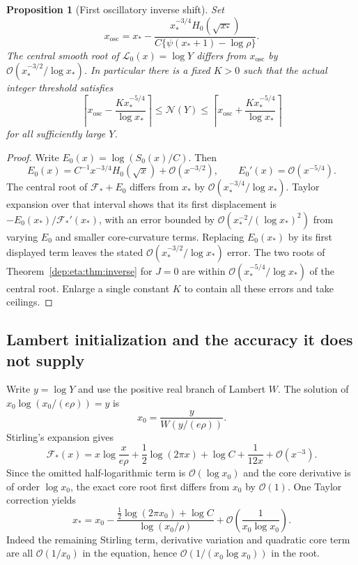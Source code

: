 \documentclass[11pt]{article}
\newtheorem{proposition}[theorem]{Proposition}
\theoremstyle{definition}\newtheorem{definition}[theorem]{Definition}
\theoremstyle{remark}\newtheorem{remark}[theorem]{Remark}
\newcommand{\OO}{\mathcal O}
\begin{document}
\begin{proposition}[First oscillatory inverse shift]\label{dep:eta:prop:shift}
Set
\begin{equation}\label{dep:eta:eq:shift}
 x_{\mathrm{osc}}=x_*-
 \frac{x_*^{-3/4}H_0(\sqrt{x_*})}
      {C\{\psi(x_*+1)-\log\rho\}}.
\end{equation}
The central smooth root of $\mathcal L_0(x)=\log Y$ differs from
$x_{\mathrm{osc}}$ by
$\OO(x_*^{-3/2}/\log x_*)$. In particular there is a fixed $K>0$
such that the actual integer threshold satisfies
\begin{equation}\label{dep:eta:eq:firstceil}
 \left\lceil x_{\mathrm{osc}}-
            \frac{Kx_*^{-5/4}}{\log x_*}\right\rceil
 \le\mathcal N(Y)\le
 \left\lceil x_{\mathrm{osc}}+
            \frac{Kx_*^{-5/4}}{\log x_*}\right\rceil
\end{equation}
for all sufficiently large $Y$.
\end{proposition}
\begin{proof}
Write $E_0(x)=\log(S_0(x)/C)$. Then
\[
 E_0(x)=C^{-1}x^{-3/4}H_0(\sqrt x)+\OO(x^{-3/2}),
 \qquad E_0'(x)=\OO(x^{-5/4}).
\]
The central root of $\mathcal F_*+E_0$ differs from $x_*$ by
$\OO(x_*^{-3/4}/\log x_*)$. Taylor expansion over that interval
shows that its first displacement is
$-E_0(x_*)/\mathcal F_*'(x_*)$, with an error bounded by
$\OO(x_*^{-2}/(\log x_*)^2)$ from varying $E_0$ and smaller
core-curvature terms. Replacing $E_0(x_*)$ by its first displayed
term leaves the stated $\OO(x_*^{-3/2}/\log x_*)$ error.
The two roots of Theorem~\ref{dep:eta:thm:inverse} for $J=0$ are within
$\OO(x_*^{-5/4}/\log x_*)$ of the central root. Enlarge a single
constant $K$ to contain all these errors and take ceilings.
\end{proof}

\subsection{Lambert initialization and the accuracy it does not supply}
Write $y=\log Y$ and use the positive real branch of Lambert $W$.
The solution of $x_0\log(x_0/(e\rho))=y$ is
\begin{equation}\label{dep:eta:eq:lambert}
 x_0=\frac{y}{W(y/(e\rho))}.
\end{equation}
Stirling's expansion gives
\[
 \mathcal F_*(x)=x\log\frac{x}{e\rho}
        +\frac12\log(2\pi x)+\log C+\frac1{12x}+\OO(x^{-3}).
\]
Since the omitted half-logarithmic term is $\OO(\log x_0)$ and the
core derivative is of order $\log x_0$, the exact core root first
differs from $x_0$ by $\OO(1)$. One Taylor correction yields
\begin{equation}\label{dep:eta:eq:lambertcorrect}
 x_*=x_0-
       \frac{\frac12\log(2\pi x_0)+\log C}{\log(x_0/\rho)}
        +\OO\left(\frac1{x_0\log x_0}\right).
\end{equation}
Indeed the remaining Stirling term, derivative variation and quadratic
core term are all $\OO(1/x_0)$ in the equation, hence
$\OO(1/(x_0\log x_0))$ in the root.
\end{document}

